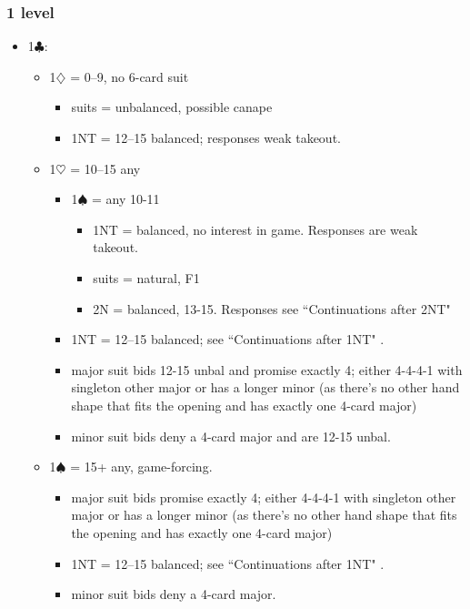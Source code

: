 \documentclass[a4paper,14pt]{extarticle}
\begin{document}
\subsubsection{1 level}
\label{sec:resp:1level}

\begin{itemize}
\item 1$\clubsuit$:
	\begin{itemize}
   \item 1$\diamondsuit$ = 0--9, no 6-card suit
		\begin{itemize}
      \item suits = unbalanced, possible canape
      \item 1NT = 12--15 balanced; responses weak takeout.
		\end{itemize}
   \item 1$\heartsuit$ = 10--15 any
		\begin{itemize}
      \item 1$\spadesuit$ = any 10-11
			\begin{itemize}
			\item 1NT = balanced, no interest in game. Responses are weak takeout.
			\item suits = natural, F1
			\item 2N = balanced, 13-15. Responses see ``Continuations after 2NT" 
			\end{itemize}
      \item 1NT = 12--15 balanced; see ``Continuations after 1NT" .
      \item major suit bids 12-15 unbal and promise exactly 4; either 4-4-4-1
            with singleton other major or has a longer minor (as there's no other
            hand shape that fits the opening and has exactly one 4-card major)
      \item minor suit bids deny a 4-card major and are 12-15 unbal.
		\end{itemize}
   \item 1$\spadesuit$ = 15+ any, game-forcing.
		\begin{itemize}
      \item major suit bids promise exactly 4; either 4-4-4-1 with singleton other
         major or has a longer minor (as there's no other hand shape that fits the
         opening and has exactly one 4-card major)
      \item 1NT = 12--15 balanced; see ``Continuations after 1NT" .
      \item minor suit bids deny a 4-card major.

\end{itemize}
\end{itemize}
\end{itemize}
\end{document}
